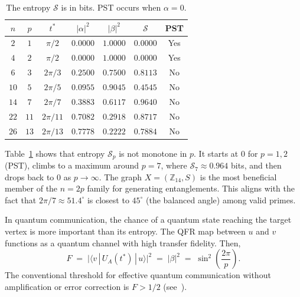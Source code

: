 \documentclass[12pt]{amsart}
\begin{document}
\begin{table}[H]
\centering
\renewcommand{\arraystretch}{1.25}
\begin{tabular}{@{}|c|c|c|c|c|c|c|@{}}
\hline
$n$ & $p$ & $t^*$ & $|\alpha|^2$ & $|\beta|^2$ & $\mathcal{S}$   & PST \\
\hline
$2$  & $1$ & $\pi/2$    & $0.0000$ & $1.0000$ & $0.0000$ & Yes \\ \hline
$4$  & $2$ & $\pi/2$    & $0.0000$ & $1.0000$ & $0.0000$ & Yes \\ \hline
$6$  & $3$ & $2\pi/3$   & $0.2500$ & $0.7500$ & $0.8113$ & No  \\ \hline
$10$ & $5$ & $2\pi/5$   & $0.0955$ & $0.9045$ & $0.4545$ & No  \\ \hline
$14$ & $7$ & $2\pi/7$   & $0.3883$ & $0.6117$ & $0.9640$ & No  \\ \hline
$22$ & $11$& $2\pi/11$  & $0.7082$ & $0.2918$ & $0.8717$ & No  \\ \hline
$26$ & $13$& $2\pi/13$  & $0.7778$ & $0.2222$ & $0.7884$ & No  \\ 
\hline
\end{tabular}
\caption{ The entropy $\mathcal{S}$ is in bits.
PST occurs when $\alpha=0$.}
\label{tab02entropy}
\end{table}

Table~\ref{tab02entropy} shows that entropy $\mathcal{S}_p$ is not monotone in $p$.  It starts at $0$ for $p = 1, 2$ (PST), climbs to a maximum around $p = 7$, where $\mathcal{S}_7 \approx 0.964$ bits, and then drops back to $0$ as $p \to \infty$.
  The graph $X = (\mathbb{Z}_{14}, S)$ is the most beneficial member of the $n = 2p$ family for generating entanglements. This aligns with the fact that $2\pi/7 \approx 51.4^{\circ}$ is closest to $45^{\circ}$ (the balanced angle) among valid primes.

In quantum communication, the chance of a quantum state reaching the target vertex is more important than its entropy. The QFR map between $u$ and $v$ functions as a quantum channel with high transfer fidelity. Then, 
\begin{equation}\label{eqq01fidelity}
  F \;=\; \bigl|\langle v \,|\, U_A(t^*) \,|\, u \rangle\bigr|^2
    \;=\; |\beta|^2
    \;=\; \sin^2\!\!\left(\frac{2\pi}{p}\right).
\end{equation}
The conventional threshold for effective quantum communication without amplification or error correction is $F > 1/2$ (see~\cite{bose2003,christandl2004}).
\end{document}
